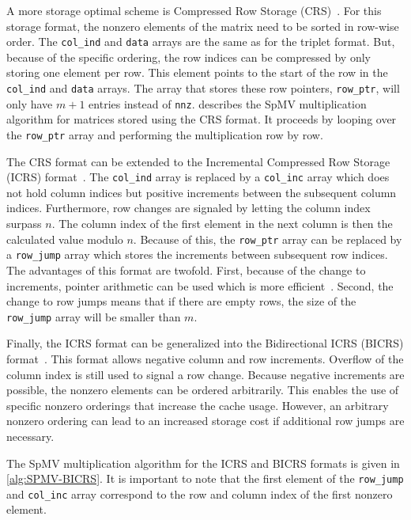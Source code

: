 \documentclass{siamart220329}
\begin{document}
A more storage optimal scheme is Compressed Row Storage (CRS)~\cite{solution-algebraic-eig-problems}. For this storage format, the nonzero elements of the matrix need to be sorted in row-wise order. The \texttt{col\_ind} and \texttt{data} arrays are the same as for the triplet format. But, because of the specific ordering, the row indices can be compressed by only storing one element per row. This element points to the start of the row in the \texttt{col\_ind} and \texttt{data} arrays. The array that stores these row pointers, \texttt{row\_ptr}, will only have $m+1$ entries instead of \texttt{nnz}.  describes the SpMV multiplication algorithm for matrices stored using the CRS format. It proceeds by looping over the \texttt{row\_ptr} array and performing the multiplication row by row.



The CRS format can be extended to the Incremental Compressed Row Storage (ICRS) format~\cite{ICRS-Koster}. The \texttt{col\_ind} array is replaced by a \texttt{col\_inc} array which does not hold column indices but positive increments between the subsequent column indices. Furthermore, row changes are signaled by letting the column index surpass $n$. The column index of the first element in the next column is then the calculated value modulo $n$. Because of this, the \texttt{row\_ptr} array can be replaced by a \texttt{row\_jump} array which stores the increments between subsequent row indices. The advantages of this format are twofold. First, because of the change to increments, pointer arithmetic can be used which is more efficient~\cite{ICRS-Koster}. Second, the change to row jumps means that if there are empty rows, the size of the \texttt{row\_jump} array will be smaller than $m$. 

Finally, the ICRS format can be generalized into the Bidirectional ICRS (BICRS) format~\cite{SpMV-Hilbert}. This format allows negative column and row increments. Overflow of the column index is still used to signal a row change. Because negative increments are possible, the nonzero elements can be ordered arbitrarily. This enables the use of specific nonzero orderings that increase the cache usage. However, an arbitrary nonzero ordering can lead to an increased storage cost if additional row jumps are necessary. 

The SpMV multiplication algorithm for the ICRS and BICRS formats is given in \cref{alg:SPMV-BICRS}. It is important to note that the first element of the \texttt{row\_jump} and \texttt{col\_inc} array correspond to the row and column index of the first nonzero element.
\end{document}
